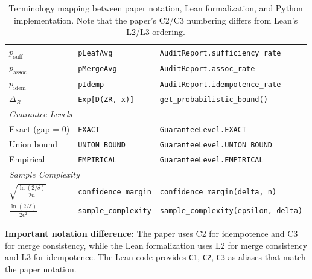 \begin{table}[h]
\begin{tabular}{lll}
$p_{\mathrm{suff}}$ & \texttt{pLeafAvg} & \texttt{AuditReport.sufficiency\_rate} \\
$p_{\mathrm{assoc}}$ & \texttt{pMergeAvg} & \texttt{AuditReport.assoc\_rate} \\
$p_{\mathrm{idem}}$ & \texttt{pIdemp} & \texttt{AuditReport.idempotence\_rate} \\
$\Delta_R$ & \texttt{Exp[D(ZR, x)]} & \texttt{get\_probabilistic\_bound()} \\
\midrule
\multicolumn{3}{l}{\emph{Guarantee Levels}} \\
Exact (gap = 0) & \texttt{EXACT} & \texttt{GuaranteeLevel.EXACT} \\
Union bound & \texttt{UNION\_BOUND} & \texttt{GuaranteeLevel.UNION\_BOUND} \\
Empirical & \texttt{EMPIRICAL} & \texttt{GuaranteeLevel.EMPIRICAL} \\
\midrule
\multicolumn{3}{l}{\emph{Sample Complexity}} \\
$\sqrt{\frac{\ln(2/\delta)}{2n}}$ & \texttt{confidence\_margin} & \texttt{confidence\_margin(delta, n)} \\
$\frac{\ln(2/\delta)}{2\epsilon^2}$ & \texttt{sample\_complexity} & \texttt{sample\_complexity(epsilon, delta)} \\
\bottomrule
\end{tabular}
\caption{Terminology mapping between paper notation, Lean formalization, and Python implementation. Note that the paper's C2/C3 numbering differs from Lean's L2/L3 ordering.}
\label{tab:terminology}
\end{table}

\noindent\textbf{Important notation difference:} The paper uses C2 for idempotence and C3 for merge consistency, while the Lean formalization uses L2 for merge consistency and L3 for idempotence. The Lean code provides \texttt{C1}, \texttt{C2}, \texttt{C3} as aliases that match the paper notation.
